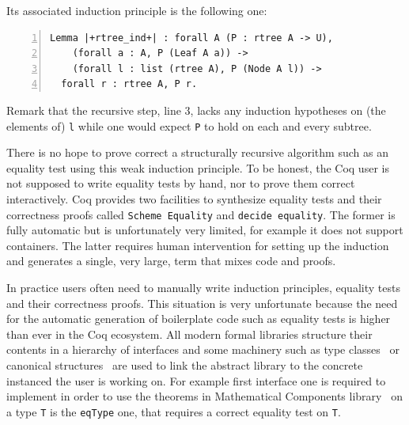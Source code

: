 \documentclass[sigplan,10pt,review]{acmart}\settopmatter{printfolios=true,printccs=false,printacmref=false}
\begin{document}
\noindent
Its associated induction principle is the following one:

\begin{minipage}{\textwidth}\begin{lstlisting}[numbers=left]
Lemma |+rtree_ind+| : forall A (P : rtree A -> U),
    (forall a : A, P (Leaf A a)) ->
    (forall l : list (rtree A), P (Node A l)) ->
  forall r : rtree A, P r.
\end{lstlisting}\end{minipage}

Remark that the recursive step, line 3, lacks any induction hypotheses
on (the elements of) \lstinline+l+ while one would expect
\lstinline+P+ to hold on each and every subtree.

There is no hope to prove correct a structurally recursive algorithm
such as an equality test using this weak induction principle.  
To be honest, the Coq
user is not supposed to write equality tests by hand, nor to prove
them correct interactively.  Coq provides two facilities to synthesize
equality tests and their correctness proofs called 
\lstinline+Scheme Equality+ and \lstinline+decide equality+. 
The former is fully
automatic but is unfortunately very limited, for example it does not support
containers.  The latter requires human intervention for setting up the
induction and generates a single, very large, term that mixes code and
proofs.

In practice
users often need to manually write induction principles,
equality tests and their correctness proofs.
This situation is very unfortunate because the need for the automatic
generation of boilerplate code such as equality tests
is higher than ever in the Coq ecosystem.
All modern formal libraries structure their contents in a
hierarchy of interfaces and some machinery such as type
classes~\cite{Sozeau:2008:FTC:1459784.1459810} or
canonical structures~\cite{10.1007/978-3-642-39634-2_5}
are used to link the abstract library to the
concrete instanced the user is working on.  For example first interface one
is required to implement in order to use the theorems in Mathematical
Components library~\cite{mcb} on a type \lstinline+T+ is the \lstinline+eqType+
one, that requires a correct equality test on \lstinline+T+.

\end{document}
